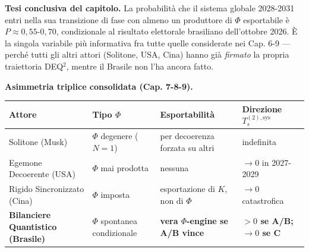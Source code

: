 \Hypoth{} \textbf{Tesi conclusiva del capitolo.} La probabilità che il
sistema globale 2028-2031 entri nella sua transizione di fase con almeno
un produttore di \(\Phi\) esportabile è \(P \approx 0{,}55\)-\(0{,}70\),
condizionale al risultato elettorale brasiliano dell'ottobre 2026. È la
singola variabile più informativa fra tutte quelle considerate nei Cap.
6-9 --- perché tutti gli altri attori (Solitone, USA, Cina) hanno già
\emph{firmato} la propria traiettoria DEQ$^2$, mentre il Brasile non l'ha
ancora fatto.

\Hypoth{} \textbf{Asimmetria triplice consolidata (Cap. 7-8-9).}

{\def\LTcaptype{none} %
{\small\begin{longtable}[]{@{}
  >{\raggedright\arraybackslash}p{}
  >{\raggedright\arraybackslash}p{}
  >{\raggedright\arraybackslash}p{}
  >{\raggedright\arraybackslash}p{}@{}}
\toprule\noalign{}
\begin{minipage}[b]{\linewidth}\raggedright
Attore
\end{minipage} & \begin{minipage}[b]{\linewidth}\raggedright
Tipo \(\Phi\)
\end{minipage} & \begin{minipage}[b]{\linewidth}\raggedright
Esportabilità
\end{minipage} & \begin{minipage}[b]{\linewidth}\raggedright
Direzione \(T_s^{(2),\text{sys}}\)
\end{minipage} \\
\midrule\noalign{}
\endhead
\bottomrule\noalign{}
\endlastfoot
Solitone (Musk) & \(\Phi\) degenere (\(N=1\)) & per decoerenza forzata
su altri & indefinita \\
Egemone Decoerente (USA) & \(\Phi\) mai prodotta & nessuna & \(\to 0\)
in 2027-2029 \\
Rigido Sincronizzato (Cina) & \(\Phi\) imposta & esportazione di \(K\),
non di \(\Phi\) & \(\to 0\) catastrofica \\
\textbf{Bilanciere Quantistico (Brasile)} & \(\Phi\) spontanea
condizionale & \textbf{vera \(\Phi\)-engine se A/B vince} &
\textbf{\(> 0\) se A/B; \(\to 0\) se C} \\
\end{longtable}}
}




